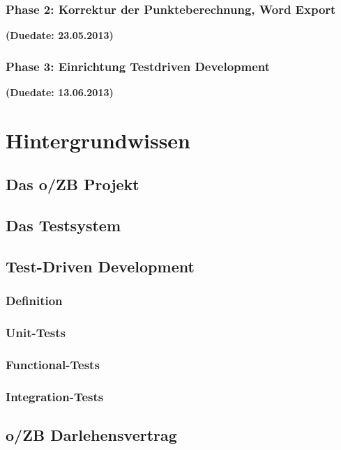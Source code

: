 \documentclass[12pt,             %
               a4paper,          %
               listof=totoc,     %
               index=totoc,      %
               bibliography=totoc,%
               oneside,         %
               BCOR1cm,          %
               english   %
               ]{scrbook}
\begin{document}
\subsection{Phase 2: Korrektur der Punkteberechnung, Word Export}
\textbf {(Duedate: 23.05.2013)}\\

\subsection{Phase 3: Einrichtung Testdriven Development}
\textbf {(Duedate: 13.06.2013)}\\


\clearpage
\chapter{Hintergrundwissen}
\section{Das o/ZB Projekt}

\section{Das Testsystem}

\section{Test-Driven Development}
\subsection{Definition}
\subsection{Unit-Tests}
\subsection{Functional-Tests}
\subsection{Integration-Tests}

\section{o/ZB Darlehensvertrag}
\end{document}
